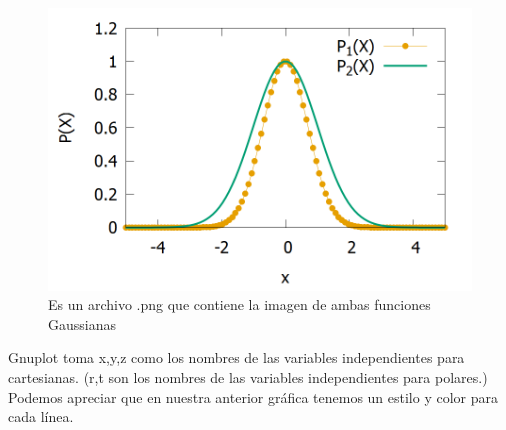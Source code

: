 \documentclass[onecolumn]{article} %
\begin{document}
\begin{figure}[h!]%
	\centering %
	\includegraphics[scale=0.2]{Grafica26Nov.png}
	\caption{\label{fig_exp}Es un archivo .png que contiene la imagen de ambas funciones Gaussianas} 
\end{figure} 
Gnuplot toma x,y,z como los nombres de las variables independientes para cartesianas. (r,t son los nombres de las variables independientes para polares.)
Podemos apreciar que en nuestra anterior gráfica tenemos un estilo y color para cada línea.
\end{document}
